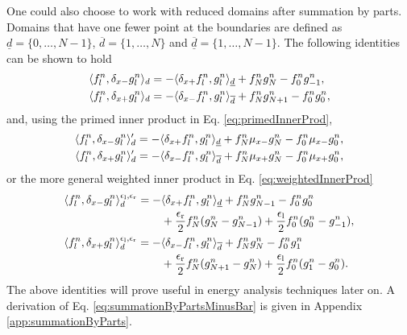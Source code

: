One could also choose to work with reduced domains after summation by parts. Domains that have one fewer point at the boundaries are defined as $\underline{d} = \{0, \hdots, N-1\}$, 
$\overline{d} = \{1, \hdots, N\}$ and $\underline{\overline{d}} = \{1, \hdots, N-1\}$. The following identities can be shown to hold
\begin{subequations}\label{eq:summationByPartsBar}
    \begin{align}
        \langle f_l^n, \delta_{x-} g_l^n \rangle_d  &= -\langle \delta_{x+} f_l^n, g_l^n\rangle_{\underline{d}} + f_N^ng_N^n - f_0^ng_{-1}^n,\label{eq:summationByPartsMinusBar}\\
        \langle f_l^n, \delta_{x+} g_l^n \rangle_d 
        &= -\langle \delta_{x-} f_l^n, g_l^n\rangle_{\overline{d}} + f_N^ng_{N+1}^n - f_0^ng_0^n,\label{eq:summationByPartsPlusBar}
    \end{align}
\end{subequations}
and, using the primed inner product in Eq. \eqref{eq:primedInnerProd},
\begin{subequations}
    \begin{align}
        \langle f_l^n, \delta_{x-} g_l^n \rangle_d'  = -\langle \delta_{x+} f_l^n, g_l^n \rangle_{\underline{d}}+f_N^n\mu_{x-} g_N^n-f_0^n\mu_{x-} g_0^n,\label{eq:primedIdentityMinus}\\
        \langle f_l^n, \delta_{x+} g_l^n \rangle_d'  = -\langle \delta_{x-} f_l^n, g_l^n \rangle_{\overline{d}}+f_N^n\mu_{x+} g_N^n-f_0^n\mu_{x+} g_0^n,\label{eq:primedIdentityPlus}
    \end{align}
\end{subequations}
%
or the more general weighted inner product in Eq. \eqref{eq:weightedInnerProd}
\begin{subequations}
    \begin{align}
       &\begin{aligned}
        \langle f_l^n, \delta_{x-} g_l^n \rangle_d^{\epsilon_\text{l},\epsilon_\text{r}}  = -&\langle \delta_{x+} f_l^n, g_l^n \rangle_{\underline{d}}+ f_N^ng_{N-1}^n - f_0^ng_0^n \\
        &+ \frac{\epsilon_\text{r}}{2}f_N^n(g_N^n-g_{N-1}^n)+ \frac{\epsilon_\text{l}}{2}f_0^n(g_0^n - g_{-1}^n),
        \end{aligned}\label{eq:weightedIdentityMinus}\\
        &\begin{aligned}
            \langle f_l^n, \delta_{x+} g_l^n \rangle_d^{\epsilon_\text{l},\epsilon_\text{r}}  = -&\langle \delta_{x-} f_l^n, g_l^n \rangle_{\overline{d}}+ f_N^ng_N^n - f_0^ng_1^n  \\
            &+ \frac{\epsilon_\text{r}}{2}f_N^n(g_{N+1}^n-g_N^n)+ \frac{\epsilon_\text{l}}{2}f_0^n(g_1^n - g_0^n).
        \end{aligned}\label{eq:weightedIdentityPlus}
    \end{align}
\end{subequations}
The above identities will prove useful in energy analysis techniques later on. A derivation of Eq. \eqref{eq:summationByPartsMinusBar} is given in Appendix \ref{app:summationByParts}. 

